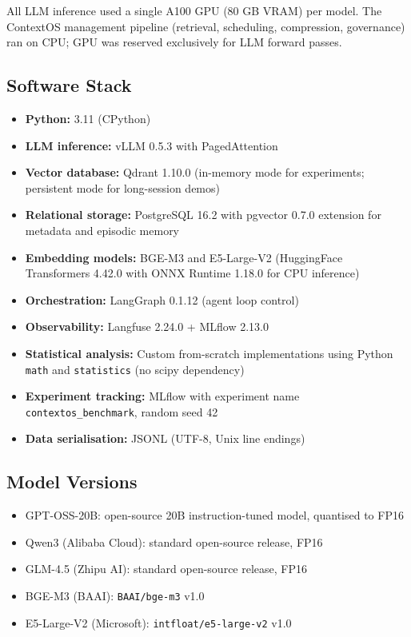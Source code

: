 All LLM inference used a single A100 GPU (80 GB VRAM) per model.  The
ContextOS management pipeline (retrieval, scheduling, compression, governance)
ran on CPU; GPU was reserved exclusively for LLM forward passes.

\subsection{Software Stack}

\begin{itemize}
  \item \textbf{Python:} 3.11 (CPython)
  \item \textbf{LLM inference:} vLLM 0.5.3 with PagedAttention
  \item \textbf{Vector database:} Qdrant 1.10.0 (in-memory mode for
        experiments; persistent mode for long-session demos)
  \item \textbf{Relational storage:} PostgreSQL 16.2 with pgvector 0.7.0
        extension for metadata and episodic memory
  \item \textbf{Embedding models:} BGE-M3 and E5-Large-V2 (HuggingFace
        Transformers 4.42.0 with ONNX Runtime 1.18.0 for CPU inference)
  \item \textbf{Orchestration:} LangGraph 0.1.12 (agent loop control)
  \item \textbf{Observability:} Langfuse 2.24.0 + MLflow 2.13.0
  \item \textbf{Statistical analysis:} Custom from-scratch implementations
        using Python \texttt{math} and \texttt{statistics} (no scipy dependency)
  \item \textbf{Experiment tracking:} MLflow with experiment name
        \texttt{contextos\_benchmark}, random seed 42
  \item \textbf{Data serialisation:} JSONL (UTF-8, Unix line endings)
\end{itemize}

\subsection{Model Versions}

\begin{itemize}
  \item GPT-OSS-20B: open-source 20B instruction-tuned model,
        quantised to FP16
  \item Qwen3 (Alibaba Cloud): standard open-source release, FP16
  \item GLM-4.5 (Zhipu AI): standard open-source release, FP16
  \item BGE-M3 (BAAI): \texttt{BAAI/bge-m3} v1.0
  \item E5-Large-V2 (Microsoft): \texttt{intfloat/e5-large-v2} v1.0
\end{itemize}

